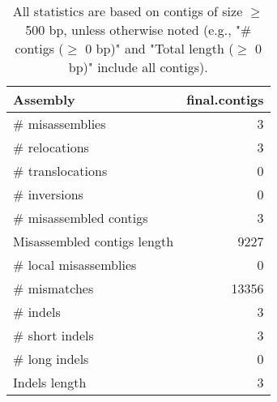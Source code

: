 \documentclass[12pt,a4paper]{article}
\begin{document}
\begin{table}[ht]
\begin{center}
\caption{All statistics are based on contigs of size $\geq$ 500 bp, unless otherwise noted (e.g., "\# contigs ($\geq$ 0 bp)" and "Total length ($\geq$ 0 bp)" include all contigs).}
\begin{tabular}{|l*{1}{|r}|}
\hline
Assembly & final.contigs \\ \hline
\# misassemblies & 3 \\ \hline
\hspace{5mm}\# relocations & 3 \\ \hline
\hspace{5mm}\# translocations & 0 \\ \hline
\hspace{5mm}\# inversions & 0 \\ \hline
\# misassembled contigs & 3 \\ \hline
Misassembled contigs length & 9227 \\ \hline
\# local misassemblies & 0 \\ \hline
\# mismatches & 13356 \\ \hline
\# indels & 3 \\ \hline
\hspace{5mm}\# short indels & 3 \\ \hline
\hspace{5mm}\# long indels & 0 \\ \hline
Indels length & 3 \\ \hline
\end{tabular}
\end{center}
\end{table}
\end{document}
